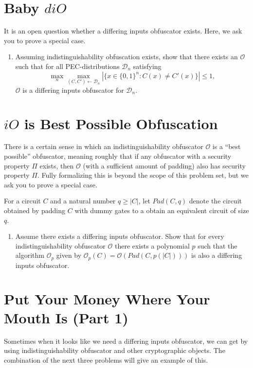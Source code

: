 \documentclass[11pt]{article}
\renewcommand{\O}{\mathcal{O}}
\newcommand{\zo}{\{0,1\}}
\newcommand{\D}{\mathcal{D}}
\newcommand{\iO}{iO}
\newcommand{\diO}{diO}
\begin{document}
\section{Baby $\diO$}
It is an open question whether a differing inputs obfuscator exists. Here, we ask you to prove a special case.

\begin{enumerate}
    \item Assuming indistinguishability obfuscation exists, show that there exists an $\O$ such that for all PEC-distributions $\D_n$ satisfying
    \[\max _n \max_{(C, C') \gets \D_n} \left | \{x \in \zo^n: C(x) \neq C'(x)\} \right | \leq 1,\]
    $\O$ is a differing inputs obfuscator for $\D_n$.
\end{enumerate}


\section{$\iO$ is Best Possible Obfuscation}
There is a certain sense in which an indistinguishability obfuscator $\O$ is a ``best possible'' obfuscator, meaning roughly that if any obfuscator with a security property $\Pi$ exists, then $\O$ (with a sufficient amount of padding) also has security property $\Pi$.
Fully formalizing this is beyond the scope of this problem set, but we ask you to prove a special case.

For a circuit $C$ and a natural number $q \geq |C|$, let $Pad(C, q)$ denote the circuit obtained by padding $C$ with dummy gates to a obtain an equivalent circuit of size $q$.

\begin{enumerate}
    \item Assume there exists a differing inputs obfuscator. Show that for every indistinguishability obfuscator $\O$ there exists a polynomial $p$ such that the algorithm $\O_p$ given by $\O_p(C) = \O(Pad(C, p(|C|)))$ is also a differing inputs obfuscator.
\end{enumerate}



\section{Put Your Money Where Your Mouth Is (Part 1)}
Sometimes when it looks like we need a differing inputs obfuscator, we can get by using indistinguishability obfuscator and other cryptographic objects. The combination of the next three problems will give an example of this.
\end{document}
